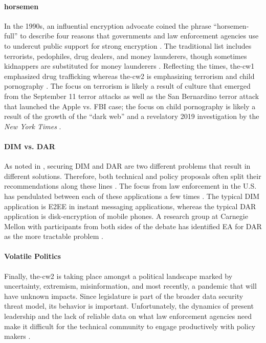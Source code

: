 \paragraph*{\Ac{horsemen}} In the 1990s, an influential encryption advocate coined the phrase ``\ac{horsemen-full}'' to
describe four reasons that governments and law enforcement agencies use to undercut public support for strong encryption
\cite{may_1994}. The traditional list includes terrorists, pedophiles, drug dealers, and money launderers, though
sometimes kidnappers are substituted for money launderers \cite{schneier_scaring_2019}. Reflecting the times,
\ac{the-cw1} emphasized drug trafficking whereas \ac{the-cw2} is emphasizing terrorism and child pornography
\cite{schulze_clipper_2017}. The focus on terrorism is likely a result of culture that emerged from the September 11
terror attacks as well as the San Bernardino terror attack that launched the Apple vs. \ac{FBI} case; the focus on child
pornography is likely a result of the growth of the ``dark web'' and a revelatory 2019 investigation by the \textit{New
York Times} \cite{keller_internet_2019}.

\paragraph*{\ac{DIM} vs. \ac{DAR}} As noted in , securing \acl{DIM} and \acl{DAR} are two
different problems that result in different solutions. Therefore, both technical and policy proposals often split their
recommendations along these lines \cite{group_2019} \cite{owen_law_2018}. The focus from law enforcement in the U.S. has
pendulated between each of these applications a few times \cite{schneier_2019}. The typical \ac{DIM} application is
\ac{E2EE} in instant messaging applications, whereas the typical \ac{DAR} application is \ac{disk-encryption} of mobile
phones. A research group at Carnegie Mellon with participants from both sides of the debate has identified \ac{EA} for
\ac{DAR} as the more tractable problem \cite{group_2019}.

\paragraph*{Volatile Politics} Finally, \ac{the-cw2} is taking place amongst a political landscape marked by
uncertainty, extremism, misinformation, and most recently, a pandemic that will have unknown impacts. Since legislature
is part of the broader data security threat model, its behavior is important. Unfortunately, the dynamics of present
leadership and the lack of reliable data on what law enforcement agencies need make it difficult for the technical
community to engage productively with policy makers \cite{granick_2018}.

